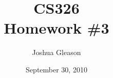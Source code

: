 \documentclass[11pt,a4paper,oneside]{article}
\begin{document}

\title{CS326 \\
       Homework \#3}
\date{September 30, 2010}

\author{Joshua Gleason}

\maketitle
\thispagestyle{empty}
\end{document}
